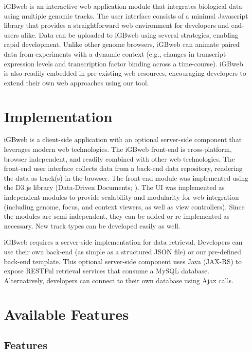 iGBweb is an interactive web application module that integrates biological data using multiple genomic tracks. The user interface consists of a minimal Javascript library that provides a straightforward web environment for developers and end-users alike. Data can be uploaded to iGBweb using several strategies, enabling rapid development. Unlike other genome browsers,  iGBweb can animate paired data from experiments with a dynamic context (e.g., changes in transcript expression levels and transcription factor binding across a time-course). iGBweb is also readily embedded in pre-existing web resources, encouraging developers to extend their own web approaches using our tool.

\section{Implementation}

iGBweb is a client-side application with an optional server-side component that leverages modern web technologies. The iGBweb front-end is cross-platform, browser independent, and readily combined with other web technologies. The front-end user interface collects data from a back-end data repository, rendering the data as track(s) in the browser. The front-end module was implemented using the D3.js library (Data-Driven Documents; \cite{bostock_d3_2011}). The UI was implemented as independent modules to provide scalability and modularity for web integration (including genome, focus, and context viewers, as well as view controllers). Since the modules are semi-independent, they can be added or re-implemented as necessary. New track types can be developed easily as well. 

iGBweb requires a server-side implementation for data retrieval. Developers can use their own back-end (as simple as a structured JSON file) or our pre-defined back-end template. This optional server-side component uses Java (JAX-RS) to expose RESTFul retrieval services that consume a MySQL database. Alternatively, developers can connect to their own database using Ajax calls. 

\section{Available Features}

\subsection{Features}


